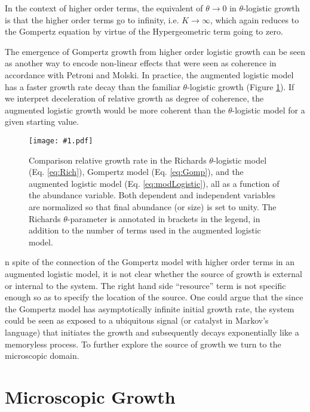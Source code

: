 \documentclass{article}
\newcommand{\insertPdfFig}[3]{
  \begin{figure}[H]
  \centering
  \texttt{[image: \#1.pdf]}
  \caption{#2}
  \label{fig:#1}
  \end{figure}
}
\begin{document}
 In the context of higher order terms, the equivalent of $\theta\rightarrow 0$ in $\theta$-logistic growth is that the higher order terms go to infinity, i.e. $K \rightarrow \infty$, which again reduces to the Gompertz equation by virtue of the Hypergeometric term going to zero. 

 The emergence of Gompertz growth from higher order logistic growth can be seen as another way to encode non-linear effects that were seen as coherence in accordance with Petroni and Molski. In practice, the augmented logistic model has a faster growth rate decay than the familiar $\theta$-logistic growth (Figure \ref{fig:hypergeometric_plain}). If we interpret deceleration of relative growth as degree of coherence, the augmented logistic growth would be more coherent than the $\theta$-logistic model for a given starting value. 

\insertPdfFig{hypergeometric_plain}{Comparison relative growth rate in the Richards $\theta$-logistic model (Eq. \ref{eq:Rich}), Gompertz model (Eq. \ref{eq:Gomp}), and the augmented logistic model (Eq. \ref{eq:modLogistic}), all as a function of the abundance variable. Both dependent and independent variables are normalized so that final abundance (or size) is set to unity. The Richards $\theta$-parameter is annotated in brackets in the legend, in addition to the number of terms used in the augmented logistic model.} 

In spite of the connection of the Gompertz model with higher order terms in an augmented logistic model, it is not clear whether the source of growth is external or internal to the system. The right hand side ``resource'' term is not specific enough so as to specify the location of the source. One could argue that the since the Gompertz model has asymptotically infinite initial growth rate, the system could be seen as exposed to a ubiquitous signal (or catalyst in Markov's language) that initiates the growth and subsequently decays exponentially like a memoryless process. To further explore the source of growth we turn to the microscopic domain.

\section{Microscopic Growth}
\label{sec:micro}
\end{document}
